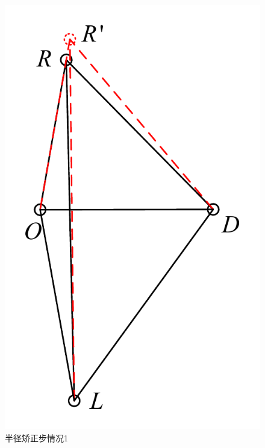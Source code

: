 \documentclass[12pt,AutoFakeSlant,AutoFakeBold]{article}
\begin{document}
\begin{figure}[!ht]
    \centering
    \begin{minipage}[t]{0.3\textwidth}
        \centering
        \includegraphics[width=\textwidth]{图片/半径矫正步1.pdf}
        \caption{半径矫正步情况1}
        \label{fig:半径矫正步1}
    \end{minipage}
    \hspace{0.1\textwidth}
    \begin{minipage}[t]{0.45\textwidth}
        \centering

\end{minipage}
\end{figure}
\end{document}
